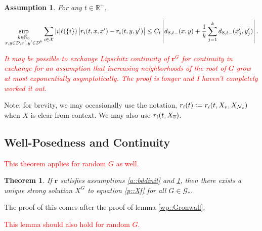 \documentclass[12pt]{article}
\newcommand{\skipLine}{\vspace{12pt}}
\newcommand{\mb}{\mathbb}
\newcommand{\mc}{\mathcal}
\newcommand{\ov}{\overline}
\newcommand{\te}{\text}
\newcommand{\tr}{\textcolor{red}}
\newcommand{\defeq}{:=}								%
\newcommand{\cad}{\mc{D}}							%
\newcommand{\sta}{\mc{X}}							%
\newcommand{\neigh}[1]{\mc{N}_{#1}}					%
\newcommand{\cl}[1]{\ov{#1}}						%
\newcommand{\Xf}{X}									%
\newcommand{\Sm}{\ell}								%
\newcommand{\rate}{r}								%
\newcommand{\stmet}[1]{
\ifstrempty{#1}{
	d_{\te{S}}}{
	d_{\te{S},#1}}}									%
\newcommand{\xf}{x}									%
\newcommand{\xg}{y}									%
\newcommand{\vind}[1]{_{#1}}						%
\newcommand{\tme}[1]{(#1)}							%
\newcommand{\gind}[1]{^{#1}}						%
\newcommand{\stpara}[1]{_{#1}}						%
\newcommand{\rateset}{\mathbf{\rate}}				%
\newcommand{\jumpbd}[1]{C_{#1}}						%
\newcommand{\Gs}{\mc{G}_\ast}						%
\newcommand{\tmepro}[3]{
\ifstrempty{#3}{
	(#1,#2)}{
	(#1,#2,#3)}}									%
\newtheorem{thms}{Theorem}[section]
\newtheorem{assu}{Assumption}
\begin{document}
\begin{assu}

\item For any \(t \in \mb{R}^+\),

\begin{equation}
\sup_{\substack{k \in \mb{N}_0\\\xf,\xg \in \cad,\xf',\xg'\in \cad^k}} \sum_{i \in \sta}|i|\Sm(\{i\})\left|\rate\stpara{i}\tmepro{t}{\xf}{\xf'} - \rate\stpara{i}\tmepro{t}{\xg}{\xg'}\right| \leq \jumpbd{t}\left|\stmet{t-}(\xf,\xg) + \frac{1}{k}\sum_{j=1}^k \stmet{t-}(\xf'\vind{j},\xg'\vind{j})\right|.
\label{a::xLipschitz}
\end{equation}

\tr{It may be possible to exchange Lipschitz continuity of \(\rateset\gind{G}\) for continuity in exchange for an assumption that increasing neighborhoods of the root of \(G\) grow at most exponentially asymptotically. The proof is longer and I haven't completely worked it out.}
\label{a::liprx}
\end{assu}

\skipLine

Note: for brevity, we may occasionally use the notation, \(\rate\stpara{i}\tme{t}\defeq \rate\stpara{i}\tmepro{t}{\Xf\vind{v}}{\Xf\vind{\neigh{v}}}\) when \(\Xf\) is clear from context. We may also use \(\rate\stpara{i}\tmepro{t}{\Xf\vind{\cl{v}}}{}\).

\subsection{Well-Posedness and Continuity}
\label{awl::wp}

\tr{This theorem applies for random \(G\) as well.}
\begin{thms}
If \(\rateset\) satisfies assumptions \ref{a::bddinit} and \ref{a::liprx}, then there exists a unique strong solution \(\Xf\gind{G}\) to equation \eqref{p::Xf} for all \(G \in \Gs\).
\label{wp::wp}
\end{thms}

The proof of this comes after the proof of lemma \ref{wp::Gronwall}.

\tr{This lemma should also hold for random \(G\).}
\end{document}
